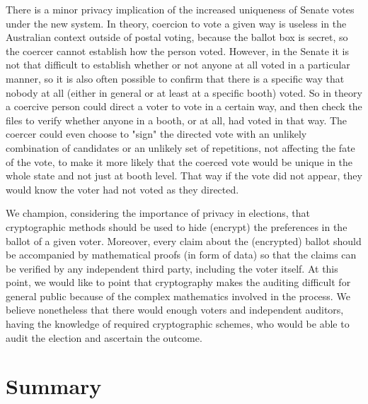    \begin{displayquote}
   
   There is a minor privacy implication of the increased uniqueness of Senate votes under the new system.  In theory, coercion to 
   vote a given way is useless in the Australian context outside of postal voting, because the ballot box is secret, so the coercer 
   cannot establish how the person voted.  However, in the Senate it is not that difficult to establish whether or not anyone at all 
   voted in a particular manner, so it is also often possible to confirm that there is a specific way that nobody at all (either in general or 
   at least at a specific booth) voted.   So in theory a coercive person could direct a voter to vote in a certain way, and then check the 
   files to verify whether anyone in a booth, or at all, had voted in that way. The coercer could even choose to "sign" the directed vote 
   with an unlikely combination of candidates or an unlikely set of repetitions, not affecting the fate of the vote, to make it more likely 
   that the coerced vote would be unique in the whole state and not just at booth level.  That way if the vote did not appear, they 
   would know the voter had not voted as they directed.
   
   \end{displayquote}
   
   
   We champion,  considering the importance of privacy in elections,  that cryptographic methods should be 
   used to hide (encrypt) the preferences in the ballot of a given voter.  
   Moreover, every claim about the (encrypted) ballot
   should be accompanied by mathematical proofs (in form of data) so that the claims can be verified 
   by any  independent third party, including the voter itself.  At this point,  we would like to point that 
   cryptography makes the auditing difficult for general public because of the complex mathematics 
   involved in the process.  We believe nonetheless that there would enough voters and independent 
   auditors, having the knowledge of required cryptographic schemes, who would be able to audit the election 
   and ascertain the outcome. 
   
   
\section{Summary}
\label{secback:summary_back}

